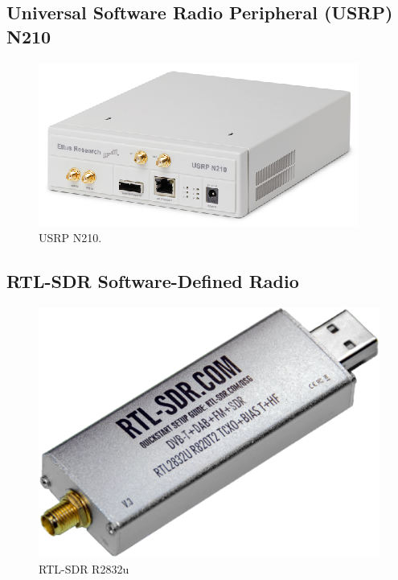 \subsection{Universal Software Radio Peripheral (USRP) N210}

\begin{figure}[ht!]
	\centering
	\includegraphics[width=\textwidth,keepaspectratio]{images/Gill/figs/usrp.eps}
    \caption{USRP N210.} 
\label{usrp}      
\end{figure}

\subsection{RTL-SDR Software-Defined Radio}

\begin{figure}[ht!]
	\centering
	\includegraphics[width=\textwidth,keepaspectratio]{images/Gill/figs/rtlsdr.eps}
    \caption{RTL-SDR R2832u} 
\label{rtlsdr}      
\end{figure}

